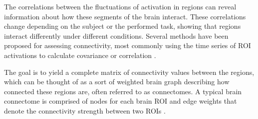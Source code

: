 		The correlations between the fluctuations of activation in regions can reveal information about how these segments of the brain interact. These correlations change depending on the subject or the performed task, showing that regions interact differently under different conditions. Several methods have been proposed for assessing connectivity, most commonly using the time series of ROI activations to calculate covariance or correlation \cite{VAROQUAUX2013405}.
		
		The goal is to yield a complete matrix of connectivity values between the regions, which can be thought of as a sort of weighted brain graph describing how connected these regions are, often referred to as connectomes. A typical brain connectome is comprised of nodes for each brain ROI and edge weights that denote the connectivity strength between two ROIs \cite{bassett2017network}.
		
		